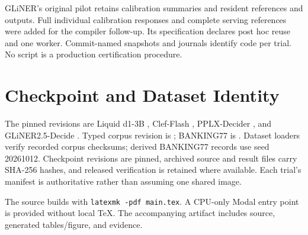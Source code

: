 \documentclass[10pt,twocolumn]{article}
\begin{document}
GLiNER's original pilot retains calibration summaries and resident references and outputs. Full individual calibration responses and complete serving references were added for the compiler follow-up. Its specification declares post hoc reuse and one worker. Commit-named snapshots and journals identify code per trial. No script is a production certification procedure.

\section{Checkpoint and Dataset Identity}
The pinned revisions are Liquid d1-3B \texttt{}, Clef-Flash \texttt{}, PPLX-Decider \texttt{}, and GLiNER2.5-Decide \texttt{}. Typed corpus revision is \texttt{}; BANKING77 is \texttt{}. Dataset loaders verify recorded corpus checksums; derived BANKING77 records use seed 20261012. Checkpoint revisions are pinned, archived source and result files carry SHA-256 hashes, and released verification is retained where available. Each trial's manifest is authoritative rather than assuming one shared image.

The source builds with \texttt{latexmk -pdf main.tex}. A CPU-only Modal entry point is provided without local TeX. The accompanying artifact includes source, generated tables/figure, and evidence.
\end{document}
